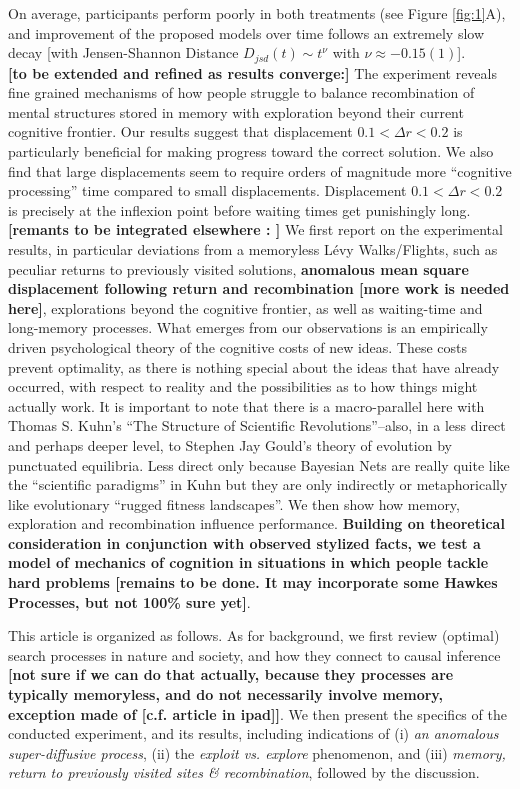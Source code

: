 On average, participants perform poorly in both treatments (see Figure \ref{fig:1}A), and improvement of the proposed models over time follows an extremely slow decay [with Jensen-Shannon Distance $D_{jsd}(t) \sim t^{\nu}$ with $ \nu \approx -0.15(1)$]. \\

{\bf [to be extended and refined as results converge:]} The experiment reveals fine grained mechanisms of how people struggle to balance recombination of mental structures stored in memory with exploration beyond their current cognitive frontier.  Our results suggest that displacement $0.1 < \Delta r < 0.2 $ is particularly beneficial for making progress toward the correct solution. We also find that large displacements seem to require orders of magnitude more ``cognitive processing'' time compared to small displacements. Displacement $0.1 < \Delta r < 0.2 $ is precisely at the inflexion point before waiting times get punishingly long.\\

{\bf [remants to be integrated elsewhere : ]} We first report on the experimental results, in particular deviations from a memoryless L\'evy Walks/Flights, such as peculiar returns to previously visited solutions, {\bf anomalous mean square displacement following return and recombination [more work is needed here]}, explorations beyond the cognitive frontier, as well as waiting-time and long-memory processes. What emerges from our observations is an empirically driven psychological theory of the cognitive costs of new ideas. These costs prevent optimality, as there is nothing special about the ideas that have already occurred, with respect to reality and the possibilities as to how things might actually work. It is important to note that there is a macro-parallel here with Thomas S. Kuhn's ``The Structure of Scientific Revolutions''--also, in a less direct and perhaps deeper level, to Stephen Jay Gould's theory of evolution by punctuated equilibria. Less direct only because Bayesian Nets are really quite like the ``scientific paradigms'' in Kuhn but they are only indirectly or metaphorically like evolutionary ``rugged fitness landscapes''. We then show how memory, exploration and recombination influence performance. {\bf Building on theoretical consideration in conjunction with observed stylized facts, we test a model of mechanics of cognition in situations in which people tackle hard problems [remains to be done. It may incorporate some Hawkes Processes, but not 100\% sure yet]}. 

This article is organized as follows. As for background, we first review (optimal) search processes in nature and society, and how they connect to causal inference {\bf [not sure if we can do that actually, because they processes are typically memoryless, and do not necessarily involve memory, exception made of [c.f. article in ipad]]}. We then present the specifics of the conducted experiment, and its results, including indications of (i) {\it an anomalous super-diffusive process},  (ii) the {\it exploit vs. explore} phenomenon, and (iii) {\it memory, return to previously visited sites \& recombination}, followed by the discussion. 





